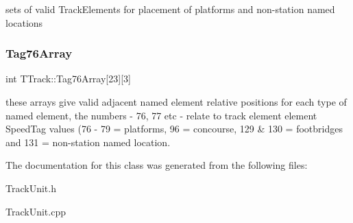 sets of valid Track\+Elements for placement of platforms and non-\/station named locations \mbox{\label{class_t_track_a8dc657245d548b3b07fdb42e173f3bba}} 
\subsubsection{\texorpdfstring{Tag76\+Array}{Tag76Array}}
{\footnotesize\ttfamily int T\+Track\+::\+Tag76\+Array\mbox{[}23\mbox{]}\mbox{[}3\mbox{]}\hspace{0.3cm}{\ttfamily [private]}}

these arrays give valid adjacent named element relative positions for each type of named element, the numbers -\/ 76, 77 etc -\/ relate to track element element Speed\+Tag values (76 -\/ 79 = platforms, 96 = concourse, 129 \& 130 = footbridges and 131 = non-\/station named location. 

The documentation for this class was generated from the following files\+:\begin{DoxyCompactItemize}
\item 
Track\+Unit.\+h\item 
Track\+Unit.\+cpp\end{DoxyCompactItemize}
